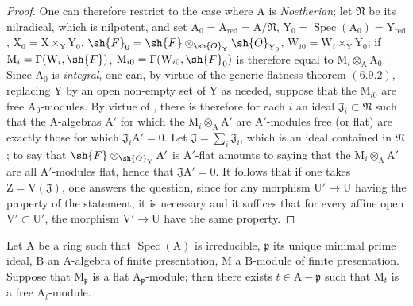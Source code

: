 \begin{proof}
One can therefore restrict to the case where $\mathrm{A}$ is \emph{Noetherian}; let $\mathfrak{N}$ be its nilradical, which is
nilpotent, and set $\mathrm{A}_0=\mathrm{A}_{\mathrm{red}}=\mathrm{A}/\mathfrak{N}$, $\mathrm{Y}_0=\operatorname{Spec}(\mathrm{A}_0)=\mathrm{Y}_{\mathrm{red}}$, $\mathrm{X}_0=\mathrm{X}\times_\mathrm{Y}\mathrm{Y}_0$, $\sh{F}_0=\sh{F}\otimes_{\sh{O}_\mathrm{Y}}\sh{O}_{\mathrm{Y}_0}$,
$\mathrm{W}_{i0}=\mathrm{W}_i\times_\mathrm{Y}\mathrm{Y}_0$; if $\mathrm{M}_i=\Gamma(\mathrm{W}_i,\sh{F})$, $\mathrm{M}_{i0}=\Gamma(\mathrm{W}_{i0},\sh{F}_0)$ is therefore equal to $\mathrm{M}_i\otimes_\mathrm{A}\mathrm{A}_0$.
Since $\mathrm{A}_0$ is \emph{integral}, one can, by virtue of the generic flatness theorem $(6.9.2)$,
replacing $\mathrm{Y}$ by an open non-empty set of $\mathrm{Y}$ as needed, suppose that the $\mathrm{M}_{i0}$ are
free $\mathrm{A}_0$-modules. By virtue of , there is therefore for each $i$ an ideal $\mathfrak{J}_i\subset\mathfrak{N}$ such
that the $\mathrm{A}$-algebras $\mathrm{A}'$ for which the $\mathrm{M}_i\otimes_\mathrm{A}\mathrm{A}'$ are $\mathrm{A}'$-modules free (or flat)
are exactly those for which $\mathfrak{J}_i\mathrm{A}'=0$. Let $\mathfrak{J}=\sum_i\mathfrak{J}_i$, which is an ideal contained
in $\mathfrak{N}$; to say that $\sh{F}\otimes_{\sh{O}_\mathrm{Y}}\mathrm{A}'$ is $\mathrm{A}'$-flat amounts to saying that the $\mathrm{M}_i\otimes_\mathrm{A}\mathrm{A}'$ are all
$\mathrm{A}'$-modules flat, hence that $\mathfrak{J}\mathrm{A}'=0$. It follows that if one takes $\mathrm{Z}=\mathrm{V}(\mathfrak{J})$, one
answers the question, since for any morphism $\mathrm{U}'\to\mathrm{U}$ having the property of the statement,
it is necessary and it suffices that for every affine open $\mathrm{V}'\subset\mathrm{U}'$, the morphism $\mathrm{V}'\to\mathrm{U}$
have the same property.
\end{proof}

\begin{corollary}[11.4.6]
\label{IV.11.4.6}
Let $\mathrm{A}$ be a ring such that $\operatorname{Spec}(\mathrm{A})$ is irreducible, $\mathfrak{p}$ its unique
minimal prime ideal, $\mathrm{B}$ an $\mathrm{A}$-algebra of finite presentation, $\mathrm{M}$ a $\mathrm{B}$-module of finite presentation.
Suppose that $\mathrm{M}_\mathfrak{p}$ is a flat $\mathrm{A}_\mathfrak{p}$-module; then there exists $t\in\mathrm{A}-\mathfrak{p}$ such that $\mathrm{M}_t$ is a free $\mathrm{A}_t$-module.
\end{corollary}

